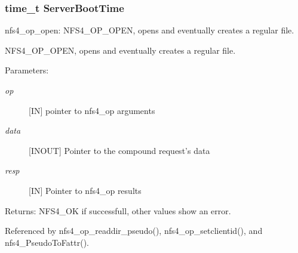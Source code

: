\subsubsection{\setlength{\rightskip}{0pt plus 5cm}time\_\-t {\bf Server\-Boot\-Time}}\label{nfs4__op__open_8c_a3}


nfs4\_\-op\_\-open: NFS4\_\-OP\_\-OPEN, opens and eventually creates a regular file.

NFS4\_\-OP\_\-OPEN, opens and eventually creates a regular file.

\begin{Desc}
\item[Parameters:]
\begin{description}
\item[{\em op}][IN] pointer to nfs4\_\-op arguments \item[{\em data}][INOUT] Pointer to the compound request's data \item[{\em resp}][IN] Pointer to nfs4\_\-op results\end{description}
\end{Desc}
\begin{Desc}
\item[Returns:]NFS4\_\-OK if successfull, other values show an error. \end{Desc}


Referenced by nfs4\_\-op\_\-readdir\_\-pseudo(), nfs4\_\-op\_\-setclientid(), and nfs4\_\-Pseudo\-To\-Fattr().